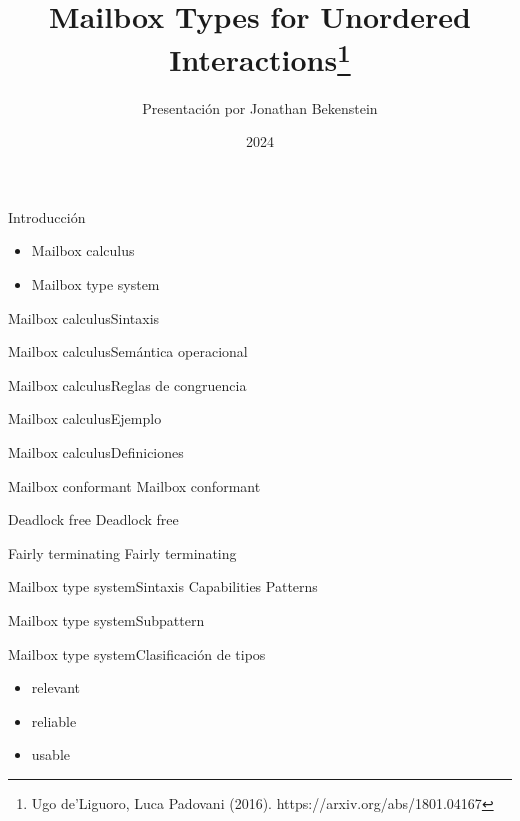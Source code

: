 \documentclass{beamer}
\title{Mailbox Types for Unordered Interactions\footnote{\tiny{Ugo de'Liguoro, Luca Padovani (2016). https://arxiv.org/abs/1801.04167}}}
\author{Presentación por Jonathan Bekenstein}
\institute{Materia optativa sobre Tipos Comportamentales y Contratos}
\date{2024}
\begin{document}
\frame{\titlepage}

\begin{frame}{Introducción}
    \begin{itemize}
        \item Mailbox calculus
        \item Mailbox type system
    \end{itemize}
\end{frame}

\begin{frame}{Mailbox calculus}{Sintaxis}
\end{frame}

\begin{frame}{Mailbox calculus}{Semántica operacional}
\end{frame}

\begin{frame}{Mailbox calculus}{Reglas de congruencia}
\end{frame}

\begin{frame}{Mailbox calculus}{Ejemplo}
\end{frame}

\begin{frame}{Mailbox calculus}{Definiciones}
    \begin{block}{Mailbox conformant}
        Mailbox conformant
    \end{block}
    \begin{block}{Deadlock free}
        Deadlock free
    \end{block}
    \begin{block}{Fairly terminating}
        Fairly terminating
    \end{block}
\end{frame}

\begin{frame}{Mailbox type system}{Sintaxis}
    Capabilities
    Patterns
\end{frame}

\begin{frame}{Mailbox type system}{Subpattern}
\end{frame}

\begin{frame}{Mailbox type system}{Clasificación de tipos}
    \begin{itemize}
        \item relevant
        \item reliable
        \item usable
    \end{itemize}
\end{frame}
\end{document}
